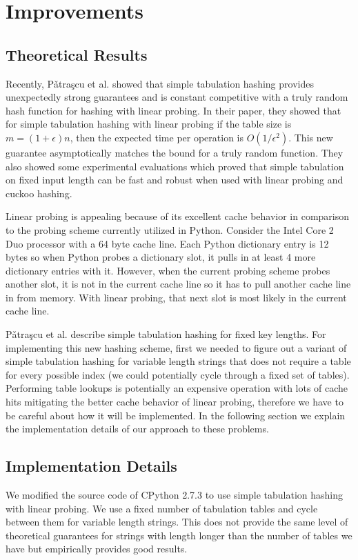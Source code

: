 \documentclass[runningheads,a4paper]{llncs}
\begin{document}
\section{Improvements}

\subsection{Theoretical Results}
Recently, P\v{a}tra\c{s}cu et al. \cite{mihai} showed that simple tabulation hashing provides unexpectedly strong guarantees and is constant competitive with a truly random hash function for hashing with linear probing. In their paper, they showed that for simple tabulation hashing with linear probing if the table size is $m = (1 + \epsilon)n$, then the expected time per operation is $O(1/\epsilon^2)$. This new guarantee asymptotically matches the
bound for a truly random function. They also showed some experimental evaluations which proved that simple tabulation on fixed input length can be fast and robust when used with linear probing and cuckoo hashing. 

Linear probing is appealing because of its excellent cache behavior in
comparison to the probing scheme currently utilized in Python.  Consider the
Intel Core 2 Duo processor with a 64 byte cache line.  Each Python dictionary
entry is 12 bytes so when Python probes a dictionary slot, it pulls in at least
4 more dictionary entries with it.  However, when the current probing scheme
probes another slot, it is not in the current cache line so it has to pull
another cache line in from memory.  With linear probing, that next slot is most likely in the current cache line.

P\v{a}tra\c{s}cu et al. \cite{mihai} describe simple tabulation hashing for fixed key lengths.  For implementing this new hashing scheme, first we needed to figure out a variant of simple tabulation hashing for variable length strings that does not require a table for every possible index (we could potentially cycle through a fixed set of tables).  Performing table lookups is potentially an expensive operation with lots of cache hits mitigating the better cache behavior of linear probing, therefore we have to be careful about how it will be implemented. In the following section we explain the implementation details of our approach to these problems.

\subsection{Implementation Details}
We modified the source code of CPython 2.7.3 to use simple tabulation hashing
with linear probing.  We use a fixed number of tabulation tables and cycle between them
for variable length strings. This does not provide the same level of theoretical guarantees for strings with length longer than the number of tables we have but empirically provides good results.
\end{document}
